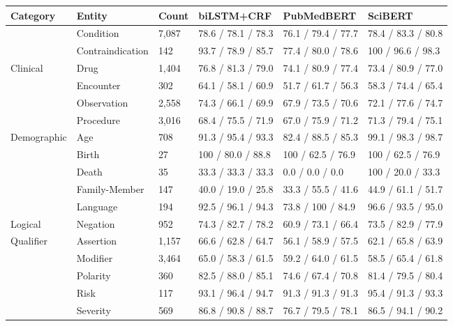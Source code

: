 \begin{tabular}{m{2cm} m{3.5cm} m{1.4cm} m{2.9cm} m{2.9cm} m{2.9cm}}
    \toprule
    \textbf{Category} & \textbf{Entity} & \textbf{Count} & \textbf{biLSTM+CRF} & \textbf{PubMedBERT} & \textbf{SciBERT} \\ \midrule
     & Condition & 7,087 & 78.6 / 78.1 / 78.3 & 76.1 / 79.4 / 77.7 & 78.4 / 83.3 / 80.8 \\
     & Contraindication & 142 & 93.7 / 78.9 / 85.7 & 77.4 / 80.0 / 78.6 & 100 / 96.6 / 98.3 \\
    Clinical & Drug & 1,404 & 76.8 / 81.3 / 79.0 & 74.1 / 80.9 / 77.4 & 73.4 / 80.9 / 77.0 \\
     & Encounter & 302 & 64.1 / 58.1 / 60.9 & 51.7 / 61.7 / 56.3 & 58.3 / 74.4 / 65.4 \\
     & Observation & 2,558 & 74.3 / 66.1 / 69.9 & 67.9 / 73.5 / 70.6 & 72.1 / 77.6 / 74.7 \\
     & Procedure & 3,016 & 68.4 / 75.5 / 71.9 & 67.0 / 75.9 / 71.2 & 71.3 / 79.4 / 75.1 \\
    \hline       
    \multirow{4}{*}[-4pt]{\mbox{Demographic}} & 
        Age & 708 & 91.3 / 95.4 / 93.3 & 82.4 / 88.5 / 85.3 & 99.1 / 98.3 / 98.7 \\
     & Birth & 27 & 100 / 80.0 / 88.8 & 100 / 62.5 / 76.9 & 100 / 62.5 / 76.9 \\
     & Death & 35 & 33.3 / 33.3 / 33.3 & 0.0 / 0.0 / 0.0 & 100 / 20.0 / 33.3 \\
     & Family-Member & 147 & 40.0 / 19.0 / 25.8 & 33.3 / 55.5 / 41.6 & 44.9 / 61.1 / 51.7 \\
     & Language & 194 & 92.5 / 96.1 / 94.3 & 73.8 / 100 / 84.9 & 96.6 / 93.5 / 95.0 \\
    \hline
    Logical & Negation & 952 & 74.3 / 82.7 / 78.2 & 60.9 / 73.1 / 66.4 & 73.5 / 82.9 / 77.9 \\
    \hline
    \multirow{6}{*}[-5pt]{\mbox{Qualifier}} &
        Assertion & 1,157 & 66.6 / 62.8 / 64.7 & 56.1 / 58.9 / 57.5 & 62.1 / 65.8 / 63.9 \\
         & Modifier & 3,464 & 65.0 / 58.3 / 61.5 & 59.2 / 64.0 / 61.5 & 58.5 / 65.4 / 61.8 \\
         & Polarity & 360 & 82.5 / 88.0 / 85.1 & 74.6 / 67.4 / 70.8 & 81.4 / 79.5 / 80.4 \\
         & Risk & 117 & 93.1 / 96.4 / 94.7 & 91.3 / 91.3 / 91.3 & 95.4 / 91.3 / 93.3 \\
         & Severity & 569 & 86.8 / 90.8 / 88.7 & 76.7 / 79.5 / 78.1 & 86.5 / 94.1 / 90.2 \\

\end{tabular}
